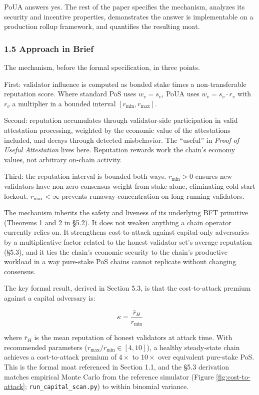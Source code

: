 \documentclass[
  11pt,
]{article}
\begin{document}
PoUA answers yes. The rest of the paper specifies the mechanism,
analyzes its security and incentive properties, demonstrates the answer
is implementable on a production rollup framework, and quantifies the
resulting moat.

\subsubsection{1.5 Approach in Brief}\label{approach-in-brief}

The mechanism, before the formal specification, in three points.

First: validator influence is computed as bonded stake times a
non-transferable reputation score. Where standard PoS uses
\(w_v = s_v\), PoUA uses \(w_v = s_v \cdot r_v\) with \(r_v\) a
multiplier in a bounded interval \([r_{\min}, r_{\max}]\).

Second: reputation accumulates through validator-side participation in
valid attestation processing, weighted by the economic value of the
attestations included, and decays through detected misbehavior. The
``useful'' in \emph{Proof of Useful Attestation} lives here. Reputation
rewards work the chain's economy values, not arbitrary on-chain
activity.

Third: the reputation interval is bounded both ways. \(r_{\min} > 0\)
ensures new validators have non-zero consensus weight from stake alone,
eliminating cold-start lockout. \(r_{\max} < \infty\) prevents runaway
concentration on long-running validators.

The mechanism inherits the safety and liveness of its underlying BFT
primitive (Theorems 1 and 2 in §5.2). It does not weaken anything a
chain operator currently relies on. It strengthens cost-to-attack
against capital-only adversaries by a multiplicative factor related to
the honest validator set's average reputation (§5.3), and it ties the
chain's economic security to the chain's productive workload in a way
pure-stake PoS chains cannot replicate without changing consensus.

The key formal result, derived in Section 5.3, is that the
cost-to-attack premium against a capital adversary is:

\[\kappa = \frac{\bar{r}_H}{r_{\min}}\]

where \(\bar{r}_H\) is the mean reputation of honest validators at
attack time. With recommended parameters
(\(r_{\max}/r_{\min} \in [4, 10]\)), a healthy steady-state chain
achieves a cost-to-attack premium of \(4\times\) to \(10\times\) over
equivalent pure-stake PoS. This is the formal moat referenced in Section
1.1, and the §5.3 derivation matches empirical Monte Carlo from the
reference simulator (Figure \ref{fig:cost-to-attack};
\texttt{run\_capital\_scan.py}) to within binomial variance.
\end{document}
